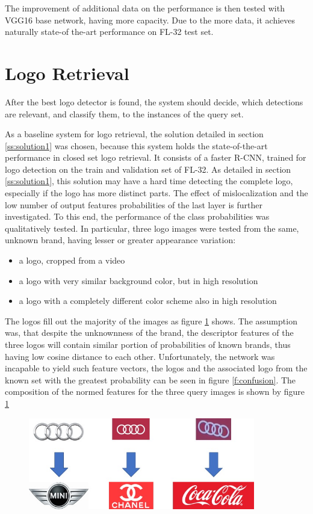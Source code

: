 The improvement of additional data on the performance is then tested with VGG16 base network, having more capacity. Due to the more data, it achieves naturally state-of the-art performance on FL-32 test set.

\section{Logo Retrieval}

After the best logo detector is found, the system should decide, which detections are relevant, and classify them, to the instances of the query set.

As a baseline system for logo retrieval, the solution detailed in section \ref{ss:solution1} was chosen, because this system holds the state-of-the-art performance in closed set logo retrieval. It consists of a faster R-CNN, trained for logo detection on the train and validation set of FL-32.
\bigbreak
As detailed in section \ref{ss:solution1}, this solution may have a hard time detecting the complete logo, especially if the logo has more distinct parts. The effect of mislocalization and the low number of output features probabilities of the last layer is further investigated. To this end, the performance of the class probabilities was qualitatively tested. In particular, three logo images were tested from the same, unknown brand, having lesser or greater appearance variation:
\begin{itemize}
	\item a logo, cropped from a video
	\item a logo with very similar background color, but in high resolution
	\item a logo with a completely different color scheme also in high resolution
\end{itemize}

The logos fill out the majority of the images as figure \ref{} shows. The assumption was, that despite the unknownness of the brand, the descriptor features of the three logos will contain similar portion of probabilities of known brands, thus having low cosine distance to each other. Unfortunately, the network was incapable to yield such feature vectors, the logos and the associated logo from the known set with the greatest probability can be seen in figure \ref{f:confusion}. The composition of the normed features for the three query images is shown by figure \ref{}

\begin{figure}
  \centering
  \includegraphics[height=40mm]{images/mt/confusion.jpg}
  \caption{}
  \label{f:fasterconfusion}
\end{figure}

